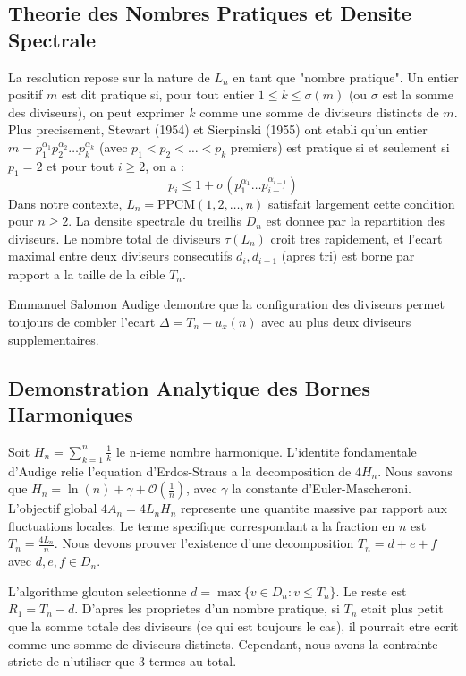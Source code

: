 \documentclass[11pt,a4paper]{article}
\begin{document}
\subsection{Theorie des Nombres Pratiques et Densite Spectrale}

La resolution repose sur la nature de $L_n$ en tant que "nombre pratique".
Un entier positif $m$ est dit pratique si, pour tout entier $1 \le k \le \sigma(m)$ (ou $\sigma$ est la somme des diviseurs), on peut exprimer $k$ comme une somme de diviseurs distincts de $m$.
Plus precisement, Stewart (1954) et Sierpinski (1955) ont etabli qu'un entier $m = p_1^{\alpha_1} p_2^{\alpha_2} \dots p_k^{\alpha_k}$ (avec $p_1 < p_2 < \dots < p_k$ premiers) est pratique si et seulement si $p_1 = 2$ et pour tout $i \ge 2$, on a :
$$ p_i \le 1 + \sigma(p_1^{\alpha_1} \dots p_{i-1}^{\alpha_{i-1}}) $$
Dans notre contexte, $L_n = \text{PPCM}(1, 2, \dots, n)$ satisfait largement cette condition pour $n \ge 2$. La densite spectrale du treillis $D_n$ est donnee par la repartition des diviseurs. Le nombre total de diviseurs $\tau(L_n)$ croit tres rapidement, et l'ecart maximal entre deux diviseurs consecutifs $d_i, d_{i+1}$ (apres tri) est borne par rapport a la taille de la cible $T_n$.

Emmanuel Salomon Audige demontre que la configuration des diviseurs permet toujours de combler l'ecart $\Delta = T_n - u_x(n)$ avec au plus deux diviseurs supplementaires.

\subsection{Demonstration Analytique des Bornes Harmoniques}

Soit $H_n = \sum_{k=1}^n \frac{1}{k}$ le n-ieme nombre harmonique.
L'identite fondamentale d'Audige relie l'equation d'Erdos-Straus a la decomposition de $4 H_n$.
Nous savons que $H_n = \ln(n) + \gamma + \mathcal{O}(\frac{1}{n})$, avec $\gamma$ la constante d'Euler-Mascheroni.
L'objectif global $4 A_n = 4 L_n H_n$ represente une quantite massive par rapport aux fluctuations locales.
Le terme specifique correspondant a la fraction en $n$ est $T_n = \frac{4 L_n}{n}$.
Nous devons prouver l'existence d'une decomposition $T_n = d + e + f$ avec $d, e, f \in D_n$.

L'algorithme glouton selectionne $d = \max \{ v \in D_n : v \le T_n \}$.
Le reste est $R_1 = T_n - d$. D'apres les proprietes d'un nombre pratique, si $T_n$ etait plus petit que la somme totale des diviseurs (ce qui est toujours le cas), il pourrait etre ecrit comme une somme de diviseurs distincts. Cependant, nous avons la contrainte stricte de n'utiliser que 3 termes au total.
\end{document}
